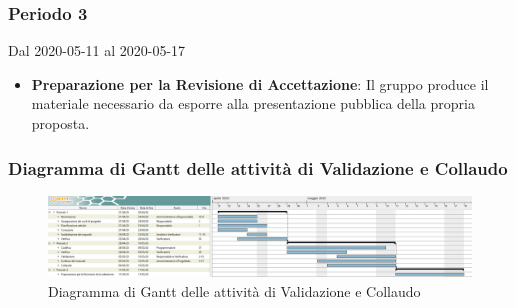 \subsubsection{Periodo 3} 
Dal 2020-05-11 al 2020-05-17
\begin{itemize}
	\item \textbf{Preparazione per la Revisione di Accettazione}: Il gruppo produce il materiale necessario da esporre alla presentazione pubblica della propria proposta.
\end{itemize}


\newpage
\begin{landscape}
\subsubsection{Diagramma di Gantt delle attività di Validazione e Collaudo}
\pagestyle{empty}
\begin{figure}[h]
	\centering
	\includegraphics[scale=1.48]{Sezioni/DiagrammiGantt/Validazione.png}
	\caption{Diagramma di Gantt delle attività di Validazione e Collaudo}
\end{figure}
\end{landscape}